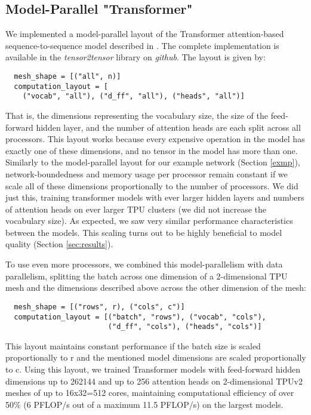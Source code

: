 \documentclass{article}
\begin{document}
\begin{itemize}
\fi

\section{Model-Parallel "Transformer"} \label{sec:transformer}

We implemented a model-parallel layout of the Transformer attention-based sequence-to-sequence model described in \cite{Vaswani17}.  The complete implementation is available in the \textit{tensor2tensor} library on \textit{github}.  The layout is given by:
\begin{verbatim}
  mesh_shape = [("all", n)]
  computation_layout = [
    ("vocab", "all"), ("d_ff", "all"), ("heads", "all")]
\end{verbatim}
That is, the dimensions representing the vocabulary size, the size of the feed-forward hidden layer, and the number of attention heads are each split across all processors.  This layout works because every expensive operation in the model has exactly one of these dimensions, and no tensor in the model has more than one.  Similarly to the model-parallel layout for our example network (Section \ref{exmp}), network-boundedness and memory usage per processor remain constant if we scale all of these dimensions proportionally to the number of processors.   We did just this, training transformer models with ever larger hidden layers and numbers of attention heads on ever larger TPU clusters (we did not increase the vocabulary size).  As expected, we saw very similar performance characteristics between the models.  This scaling turns out to be highly beneficial to model quality (Section \ref{sec:results}).

To use even more processors, we combined this model-parallelism with data parallelism, splitting the batch across one dimension of a 2-dimensional TPU mesh and the dimensions described above across the other dimension of the mesh:
\begin{verbatim}
  mesh_shape = [("rows", r), ("cols", c")]
  computation_layout = [("batch", "rows"), ("vocab", "cols"),
                        ("d_ff", "cols"), ("heads", "cols")]
\end{verbatim}
This layout maintains constant performance if the batch size is scaled proportionally to r and the mentioned model dimensions are scaled proportionally to c.  Using this layout, we trained Transformer models with feed-forward hidden dimensions up to 262144 and up to 256 attention heads on 2-dimensional TPUv2 meshes of up to 16x32=512 cores, maintaining computational efficiency of over 50\% (6 PFLOP/s out of a maximum 11.5 PFLOP/s) on the largest models.


\end{itemize}
\end{document}
